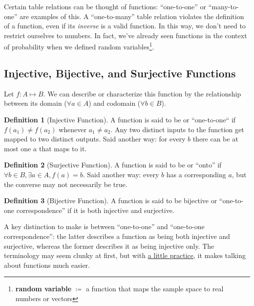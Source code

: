 \documentclass[12pt,english]{scrartcl}
\theoremstyle{definition}
\newtheorem{definition}{Definition}[section]
\theoremstyle{remark}
\begin{document}
Certain table relations can be thought of functions: ``one-to-one'' or
``many-to-one'' are examples of this. A ``one-to-many'' table relation violates
the definition of a function, even if its \textit{inverse} is a valid function.
In this way, we don't need to restrict ourselves to numbers. In fact, we've
already seen functions in the context of probability when we defined random
variables\footnote{\textbf{random variable} $\coloneqq$ a function that maps
the sample space to real numbers or vectors}.

\subsection{Injective, Bijective, and Surjective Functions}%
\label{sub:injective_bijective_and_surjective_functions}

Let $f \colon A \mapsto B$. We can describe or characterize this function by
the relationship between its domain ($\forall a \in A$) and codomain
($\forall b \in B$).

\begin{definition}[Injective Function] A function is said to be
     or ``one-to-one`` if  $f(a_{1}) \neq f(a_{2})$ whenever
    $a_{1} \neq a_{2}$.  Any two distinct inputs to the function get mapped to
    two distinct outputs.  Said another way: for every $b$ there can be at most
    one $a$ that maps to it.
\end{definition}

\begin{definition}[Surjective Function] A function is said to be
     or ``onto'' if  $\forall b \in B , \exists a \in A,
    f(a) = b$. Said another way: every $b$ has a corresponding $a$, but the
    converse may not necessarily be true.
\end{definition}

\begin{definition}[Bijective Function] A function is said to be bijective or
    ``one-to-one correspondence'' if it is both injective and surjective.
\end{definition}

A key distinction to make is between ``one-to-one'' and ``one-to-one
correspondence'': the latter describes a function as being both injective and
surjective, whereas the former describes it as being injective only. The terminology
may seem clunky at first, but with
\href{https://brilliant.org/wiki/bijection-injection-and-surjection/}{a little
practice}, it makes talking about functions much easier.
\end{document}
